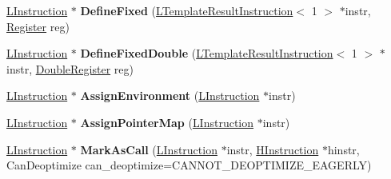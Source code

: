 \begin{DoxyCompactItemize}
\item 
\hyperlink{classv8_1_1internal_1_1_l_instruction}{L\+Instruction} $\ast$ {\bfseries Define\+Fixed} (\hyperlink{classv8_1_1internal_1_1_l_template_result_instruction}{L\+Template\+Result\+Instruction}$<$ 1 $>$ $\ast$instr, \hyperlink{structv8_1_1internal_1_1_register}{Register} reg)\hypertarget{classv8_1_1internal_1_1_l_chunk_builder_a7dfb72b4e8c8ed4fc4acb6c8ce207af9}{}\label{classv8_1_1internal_1_1_l_chunk_builder_a7dfb72b4e8c8ed4fc4acb6c8ce207af9}

\item 
\hyperlink{classv8_1_1internal_1_1_l_instruction}{L\+Instruction} $\ast$ {\bfseries Define\+Fixed\+Double} (\hyperlink{classv8_1_1internal_1_1_l_template_result_instruction}{L\+Template\+Result\+Instruction}$<$ 1 $>$ $\ast$instr, \hyperlink{structv8_1_1internal_1_1_double_register}{Double\+Register} reg)\hypertarget{classv8_1_1internal_1_1_l_chunk_builder_aa9504301e737cc0e32d8dabaa2583e90}{}\label{classv8_1_1internal_1_1_l_chunk_builder_aa9504301e737cc0e32d8dabaa2583e90}

\item 
\hyperlink{classv8_1_1internal_1_1_l_instruction}{L\+Instruction} $\ast$ {\bfseries Assign\+Environment} (\hyperlink{classv8_1_1internal_1_1_l_instruction}{L\+Instruction} $\ast$instr)\hypertarget{classv8_1_1internal_1_1_l_chunk_builder_a57688ea94214122c105fd9dcb458067c}{}\label{classv8_1_1internal_1_1_l_chunk_builder_a57688ea94214122c105fd9dcb458067c}

\item 
\hyperlink{classv8_1_1internal_1_1_l_instruction}{L\+Instruction} $\ast$ {\bfseries Assign\+Pointer\+Map} (\hyperlink{classv8_1_1internal_1_1_l_instruction}{L\+Instruction} $\ast$instr)\hypertarget{classv8_1_1internal_1_1_l_chunk_builder_a310b14c9a7f420e8294d1180c8ea030b}{}\label{classv8_1_1internal_1_1_l_chunk_builder_a310b14c9a7f420e8294d1180c8ea030b}

\item 
\hyperlink{classv8_1_1internal_1_1_l_instruction}{L\+Instruction} $\ast$ {\bfseries Mark\+As\+Call} (\hyperlink{classv8_1_1internal_1_1_l_instruction}{L\+Instruction} $\ast$instr, \hyperlink{classv8_1_1internal_1_1_h_instruction}{H\+Instruction} $\ast$hinstr, Can\+Deoptimize can\+\_\+deoptimize=C\+A\+N\+N\+O\+T\+\_\+\+D\+E\+O\+P\+T\+I\+M\+I\+Z\+E\+\_\+\+E\+A\+G\+E\+R\+LY)\hypertarget{classv8_1_1internal_1_1_l_chunk_builder_af7d51aa993ccf0b54ae1599f1bc027d1}{}\label{classv8_1_1internal_1_1_l_chunk_builder_af7d51aa993ccf0b54ae1599f1bc027d1}


\end{DoxyCompactItemize}
